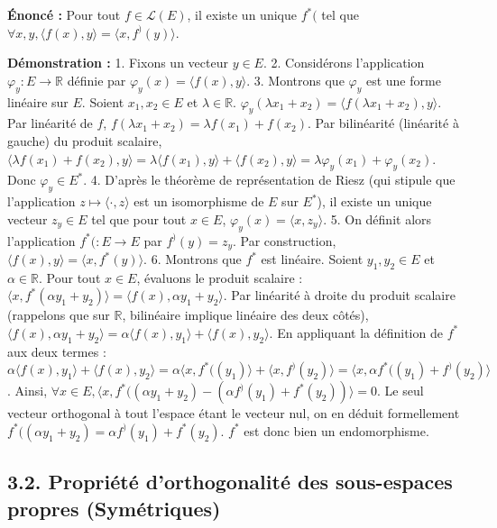 \documentclass[11pt,a4paper]{article}
\begin{document}
\textbf{Énoncé :} Pour tout $f \in \mathcal{L}(E)$, il existe un unique $f^*($ tel que $\forall x, y, \langle f(x), y \rangle = \langle x, f^)(y) \rangle$.

\textbf{Démonstration :}
1. Fixons un vecteur $y \in E$.
2. Considérons l'application $\varphi_y : E \to \mathbb{R}$ définie par $\varphi_y(x) = \langle f(x), y \rangle$.
3. Montrons que $\varphi_y$ est une forme linéaire sur $E$.
   Soient $x_1, x_2 \in E$ et $\lambda \in \mathbb{R}$.
   $\varphi_y(\lambda x_1 + x_2) = \langle f(\lambda x_1 + x_2), y \rangle$.
   Par linéarité de $f$, $f(\lambda x_1 + x_2) = \lambda f(x_1) + f(x_2)$.
   Par bilinéarité (linéarité à gauche) du produit scalaire,
   $\langle \lambda f(x_1) + f(x_2), y \rangle = \lambda \langle f(x_1), y \rangle + \langle f(x_2), y \rangle = \lambda \varphi_y(x_1) + \varphi_y(x_2)$.
   Donc $\varphi_y \in E^*$.
4. D'après le théorème de représentation de Riesz (qui stipule que l'application $z \mapsto \langle \cdot, z \rangle$ est un isomorphisme de $E$ sur $E^*$), il existe un unique vecteur $z_y \in E$ tel que pour tout $x \in E$, $\varphi_y(x) = \langle x, z_y \rangle$.
5. On définit alors l'application $f^*( : E \to E$ par $f^)(y) = z_y$. Par construction, $\langle f(x), y \rangle = \langle x, f^*(y) \rangle$.
6. Montrons que $f^*$ est linéaire. Soient $y_1, y_2 \in E$ et $\alpha \in \mathbb{R}$. Pour tout $x \in E$, évaluons le produit scalaire :
   $\langle x, f^*(\alpha y_1 + y_2) \rangle = \langle f(x), \alpha y_1 + y_2 \rangle$.
   Par linéarité à droite du produit scalaire (rappelons que sur $\mathbb{R}$, bilinéaire implique linéaire des deux côtés),
   $\langle f(x), \alpha y_1 + y_2 \rangle = \alpha \langle f(x), y_1 \rangle + \langle f(x), y_2 \rangle$.
   En appliquant la définition de $f^*$ aux deux termes :
   $\alpha \langle f(x), y_1 \rangle + \langle f(x), y_2 \rangle = \alpha \langle x, f^*((y_1) \rangle + \langle x, f^)(y_2) \rangle = \langle x, \alpha f^*((y_1) + f^)(y_2) \rangle$.
   Ainsi, $\forall x \in E, \langle x, f^*((\alpha y_1 + y_2) - (\alpha f^)(y_1) + f^*(y_2)) \rangle = 0$.
   Le seul vecteur orthogonal à tout l'espace étant le vecteur nul, on en déduit formellement $f^*((\alpha y_1 + y_2) = \alpha f^)(y_1) + f^*(y_2)$.
   $f^*$ est donc bien un endomorphisme.

\subsection{3.2. Propriété d'orthogonalité des sous-espaces propres (Symétriques)}
\end{document}
